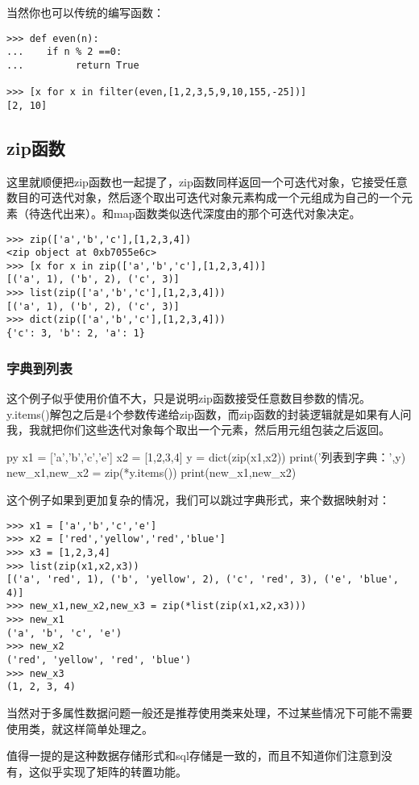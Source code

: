 \documentclass[12pt,oneside]{book}
\begin{document}
\begin{common-format}
当然你也可以传统的编写函数：
\begin{Verbatim}
>>> def even(n):
...    if n % 2 ==0:
...         return True

>>> [x for x in filter(even,[1,2,3,5,9,10,155,-25])]
[2, 10]
\end{Verbatim}

\subsection{zip函数}
这里就顺便把zip函数也一起提了，zip函数同样返回一个可迭代对象，它接受任意数目的可迭代对象，然后逐个取出可迭代对象元素构成一个元组成为自己的一个元素（待迭代出来）。和map函数类似迭代深度由的那个可迭代对象决定。
\begin{Verbatim}
>>> zip(['a','b','c'],[1,2,3,4])
<zip object at 0xb7055e6c>
>>> [x for x in zip(['a','b','c'],[1,2,3,4])]
[('a', 1), ('b', 2), ('c', 3)]
>>> list(zip(['a','b','c'],[1,2,3,4]))
[('a', 1), ('b', 2), ('c', 3)]
>>> dict(zip(['a','b','c'],[1,2,3,4]))
{'c': 3, 'b': 2, 'a': 1}
\end{Verbatim}

\subsubsection{字典到列表}
这个例子似乎使用价值不大，只是说明zip函数接受任意数目参数的情况。y.items()解包之后是4个参数传递给zip函数，而zip函数的封装逻辑就是如果有人问我，我就把你们这些迭代对象每个取出一个元素，然后用元组包装之后返回。
\begin{xverbatim}[129]{py}
x1 = ['a','b','c','e']
x2 = [1,2,3,4]
y = dict(zip(x1,x2))
print('列表到字典：',y)
new_x1,new_x2 = zip(*y.items())
print(new_x1,new_x2)
\end{xverbatim}

这个例子如果到更加复杂的情况，我们可以跳过字典形式，来个数据映射对：
\begin{Verbatim}
>>> x1 = ['a','b','c','e']
>>> x2 = ['red','yellow','red','blue']
>>> x3 = [1,2,3,4]
>>> list(zip(x1,x2,x3))
[('a', 'red', 1), ('b', 'yellow', 2), ('c', 'red', 3), ('e', 'blue', 4)]
>>> new_x1,new_x2,new_x3 = zip(*list(zip(x1,x2,x3)))
>>> new_x1
('a', 'b', 'c', 'e')
>>> new_x2
('red', 'yellow', 'red', 'blue')
>>> new_x3
(1, 2, 3, 4)
\end{Verbatim}

当然对于多属性数据问题一般还是推荐使用类来处理，不过某些情况下可能不需要使用类，就这样简单处理之。

值得一提的是这种数据存储形式和sql存储是一致的，而且不知道你们注意到没有，这似乎实现了矩阵的转置功能。








\end{common-format}
\end{document}

